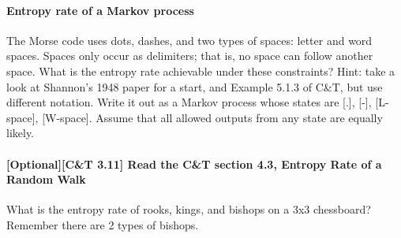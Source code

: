 \documentclass{article}
\begin{document}
\paragraph{Entropy rate of a Markov process}

The Morse code uses dots, dashes, and two types of spaces: letter and word
spaces.  Spaces only occur as delimiters; that is, no space can follow another
space. What is the entropy rate achievable under these constraints?  Hint: take
a look at Shannon’s 1948 paper for a start, and Example 5.1.3 of C\&T, but use
different notation. Write it out as a Markov process whose states are [.], [-],
[L-space], [W-space]. Assume that all allowed outputs from any state are equally
likely.  

\paragraph{[Optional][C\&T 3.11] Read the C\&T section 4.3, Entropy Rate of a
    Random Walk}  What is the entropy rate of rooks, kings, and bishops on a 3x3
chessboard?  Remember there are 2 types of bishops.
\end{document}
